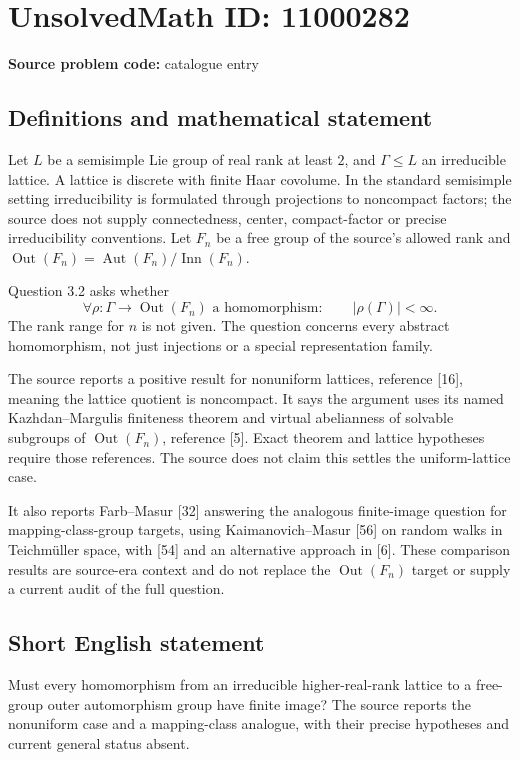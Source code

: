 \documentclass[11pt]{article}
\begin{document}
\section*{UnsolvedMath ID: 11000282}
\textbf{Source problem code:} catalogue entry
\subsection{Definitions and mathematical statement}
Let \(L\) be a semisimple Lie group of real rank at least \(2\), and \(\Gamma\le L\) an irreducible lattice. A lattice is discrete with finite Haar covolume. In the standard semisimple setting irreducibility is formulated through projections to noncompact factors; the source does not supply connectedness, center, compact-factor or precise irreducibility conventions. Let \(F_n\) be a free group of the source's allowed rank and \(\operatorname{Out}(F_n)=\operatorname{Aut}(F_n)/\operatorname{Inn}(F_n)\).

Question 3.2 asks whether
\[
 \forall\rho:\Gamma\longrightarrow\operatorname{Out}(F_n)
       \text{ a homomorphism}:\qquad |\rho(\Gamma)|<\infty.
\]
The rank range for \(n\) is not given. The question concerns every abstract homomorphism, not just injections or a special representation family.

The source reports a positive result for nonuniform lattices, reference [16], meaning the lattice quotient is noncompact. It says the argument uses its named Kazhdan--Margulis finiteness theorem and virtual abelianness of solvable subgroups of \(\operatorname{Out}(F_n)\), reference [5]. Exact theorem and lattice hypotheses require those references. The source does not claim this settles the uniform-lattice case.

It also reports Farb--Masur [32] answering the analogous finite-image question for mapping-class-group targets, using Kaimanovich--Masur [56] on random walks in Teichmüller space, with [54] and an alternative approach in [6]. These comparison results are source-era context and do not replace the \(\operatorname{Out}(F_n)\) target or supply a current audit of the full question.
\subsection{Short English statement}
Must every homomorphism from an irreducible higher-real-rank lattice to a free-group outer automorphism group have finite image? The source reports the nonuniform case and a mapping-class analogue, with their precise hypotheses and current general status absent.
\end{document}
